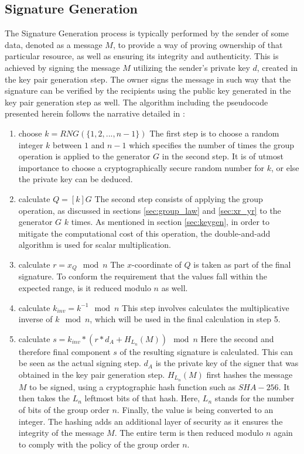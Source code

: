 \subsection{Signature Generation}\label{sec:verify}
\label{subsection:siggen}
The Signature Generation process is typically performed by the sender of some data, denoted as a message $M$, to provide a way of proving ownership of that particular resource, as well as ensuring its integrity and authenticity. This is achieved by signing the message $M$ utilizing the sender's private key $d$, created in the key pair generation step. The owner signs the message in such way that the signature can be verified by the recipients using the public key generated in the key pair generation step as well. The algorithm including the pseudocode presented herein follows the narrative detailed in \cite{9422589}:
	\begin{enumerate}
	\item choose $k = RNG(\{1,2,...,n-1\})$\newline
	The first step is to choose a random integer $k$ between $1$ and $n-1$ which specifies the number of times the group operation is applied to the generator $G$ in the second step. It is of utmost importance to choose a cryptographically secure random number for $k$, or else the private key can be deduced.
	\item calculate $Q = [k]G$\newline
	The second step consists of applying the group operation, as discussed in sections \ref{sec:group_law} and \ref{sec:xr_yr} to the generator $G$ $k$ times. As mentioned in section \ref{sec:keygen}, in order to mitigate the computational cost of this operation, the double-and-add algorithm is used for scalar multiplication.
	\item calculate $r = x_Q \mod{n}$\newline
	The $x$-coordinate of $Q$ is taken as part of the final signature. To conform the requirement that the values fall within the expected range, is it reduced modulo $n$ as well.
	\item calculate $k_{inv} = k^{-1} \mod{n}$\newline
	This step involves calculates the multiplicative inverse of $k \mod{n}$, which will be used in the final calculation in step 5.
	\item calculate $s = k_{inv} * (r * d_A + H_{L_n}(M)) \mod{n}$\newline
	Here the second and therefore final component $s$ of the resulting signature is calculated. This can be seen as the actual signing step. $d_A$ is the private key of the signer that was obtained in the key pair generation step. $H_{L_n}(M)$ first hashes the message $M$ to be signed, using a cryptographic hash function such as $SHA-256$. It then takes the $L_n$ leftmost bits of that hash. Here, $L_n$ stands for the number of bits of the group order $n$. Finally, the value is being converted to an integer. The hashing adds an additional layer of security as it ensures the integrity of the message $M$. The entire term is then reduced modulo $n$ again to comply with the policy of the group order $n$.

\end{enumerate}
